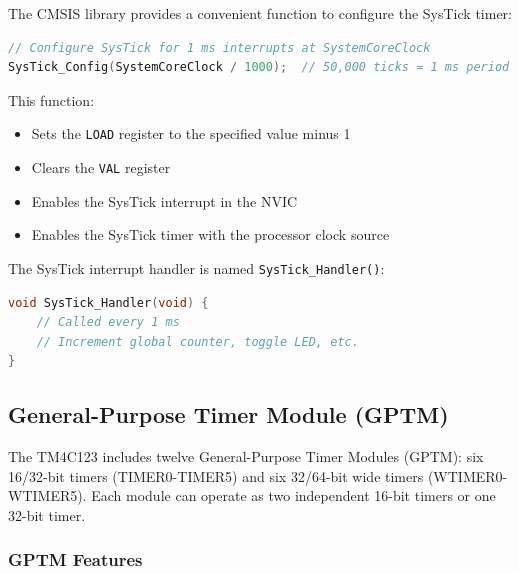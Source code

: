 The CMSIS library provides a convenient function to configure the SysTick timer:

\begin{lstlisting}[caption={SysTick configuration using CMSIS}, language=C]
// Configure SysTick for 1 ms interrupts at SystemCoreClock
SysTick_Config(SystemCoreClock / 1000);  // 50,000 ticks = 1 ms period
\end{lstlisting}

\noindent
This function:
\begin{itemize}[nosep]
  \item Sets the \texttt{LOAD} register to the specified value minus 1
  \item Clears the \texttt{VAL} register
  \item Enables the SysTick interrupt in the NVIC
  \item Enables the SysTick timer with the processor clock source
\end{itemize}

\noindent
The SysTick interrupt handler is named \texttt{SysTick\_Handler()}:

\begin{lstlisting}[language=C]
void SysTick_Handler(void) {
    // Called every 1 ms
    // Increment global counter, toggle LED, etc.
}
\end{lstlisting}

\subsection{General-Purpose Timer Module (GPTM)}

The TM4C123 includes twelve General-Purpose Timer Modules (GPTM): six 16/32-bit timers (TIMER0-TIMER5) and six 32/64-bit wide timers (WTIMER0-WTIMER5). Each module can operate as two independent 16-bit timers or one 32-bit timer.

\subsubsection{GPTM Features}


